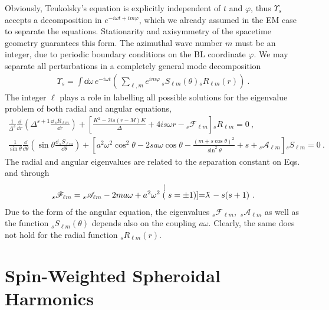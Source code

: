 Obviously, Teukolsky's equation is explicitly independent of $t$ and $\varphi$, thus $\Upsilon_s$ accepts a decomposition in $e^{-i \omega t + i m \varphi}$, which we already assumed in the EM case to separate the equations.
Stationarity and axisymmetry of the spacetime geometry guarantees this form.
The azimuthal wave number $m$ must be an integer, due to periodic boundary conditions on the BL coordinate $\varphi$.
We may separate all perturbations in a completely general mode decomposition
\begin{align}
    \label{eq3:multipoleExpansion}
    \Upsilon_s = \int\dd\omega \, e^{-i \omega t} \left( \,\sum_{\ell,m} e^{i m \varphi} \, {}_{s}S_{\ell m}(\theta) {}_{s}R_{\ell m}(r) \right) ~.
\end{align}
The integer $\ell$ plays a role in labelling all possible solutions for the eigenvalue problem of both radial and angular equations,
\begin{align}
    \label{eq3:teukolskyRadial}
    \frac{1}{\Delta^s} \frac{\dd}{\dd r} \left( \Delta^{s+1} \frac{\dd\, {}_{s}R_{\ell m}}{\dd r} \right)
    + \left[ \frac{K^2 - 2 i s (r-M)K}{\Delta} + 4 i s \omega r -{}_{s}\mathscr{F}_{\ell m}  \right] {}_{s}R_{\ell m} = 0 ~, \\[0.15cm]
    \label{eq3:teukolskyAngular}
    \frac{1}{\sin\theta} \frac{\dd}{\dd\theta} \left( \sin\theta \frac{\dd\, {}_{s}S_{\ell m}}{\dd \theta} \right)
    + \left[ a^2 \omega^2 \cos^2\theta - 2 s a \omega \cos\theta - \frac{(m + s \cos\theta)^2}{\sin^2\theta} + s + {}_{s}\mathscr{A}_{\ell m} \right] {}_{s}S_{\ell m}  = 0~.
\end{align}
The radial and angular eigenvalues are related to the separation constant on Eqs.  and  through
\begin{align}
    {}_{s}\mathscr{F}_{\ell m} = {}_{s}\mathscr{A}_{\ell m} - 2 m a \omega + a^2 \omega^2 \stackrel[(s=\pm 1)]{}{=} \lambdabar - s(s+1) ~.
    \label{eq3:relationEVs}
\end{align}
Due to the form of the angular equation, the eigenvalues ${}_{s}\mathscr{F}_{\ell m}$, \,${}_{s}\mathscr{A}_{\ell m}$ as well as the function ${}_{s}S_{\ell m}(\theta)$ depends also on the coupling $a \omega$.
Clearly, the same does not hold for the radial function ${}_{s}R_{\ell m}(r)$. 

\section{Spin-Weighted Spheroidal Harmonics}

